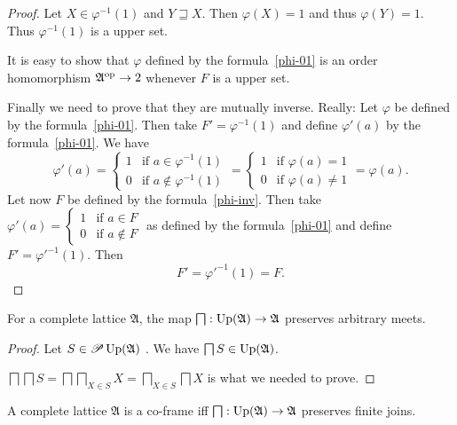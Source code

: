 \begin{proof}
Let $X\in\varphi^{-1}(1)$ and $Y\sqsupseteq X$. Then $\varphi(X)=1$
and thus $\varphi(Y)=1$. Thus $\varphi^{-1}(1)$ is a upper set.

It is easy to show that $\varphi$ defined by the formula~\ref{phi-01}
is an order homomorphism $\mathfrak{A}^{\operatorname{op}}\rightarrow2$ whenever
$F$ is a upper set.

Finally we need to prove that they are mutually inverse. Really: Let
$\varphi$ be defined by the formula~\ref{phi-01}. Then take $F'=\varphi^{-1}(1)$
and define $\varphi'(a)$ by the formula~\ref{phi-01}. We have 
\[
\varphi'(a)=\left\{ \begin{array}{ll}
1 & \text{if }a\in\varphi^{-1}(1)\\
0 & \text{if }a\notin\varphi^{-1}(1)
\end{array}\right.=\left\{ \begin{array}{ll}
1 & \text{if }\varphi(a)=1\\
0 & \text{if }\varphi(a)\neq1
\end{array}\right.=\varphi(a).
\]
Let now $F$ be defined by the formula~\ref{phi-inv}. Then take
$\varphi'(a)=\left\{ \begin{array}{ll}
1 & \text{if }a\in F\\
0 & \text{if }a\notin F
\end{array}\right.$ as defined by the formula~\ref{phi-01} and define $F'=\varphi'^{-1}(1)$.
Then 
\[
F'=\varphi'^{-1}(1)=F.
\]
\end{proof}
\begin{lem}
For a complete lattice $\mathfrak{A}$, the map $\bigsqcap:\operatorname{Up}(\mathfrak{A})\rightarrow\mathfrak{A}$
preserves arbitrary meets.\end{lem}
\begin{proof}
Let $S\in\mathscr{P}\operatorname{Up}(\mathfrak{A})$ . We have $\bigsqcap S\in\operatorname{Up}(\mathfrak{A})$.

$\bigsqcap\bigsqcap S=\bigsqcap\bigsqcap_{X\in S}X=\bigsqcap_{X\in S}\bigsqcap X$
is what we needed to prove.\end{proof}
\begin{lem}
A complete lattice $\mathfrak{A}$ is a co-frame iff $\bigsqcap:\operatorname{Up}(\mathfrak{A})\rightarrow\mathfrak{A}$
preserves finite joins.\end{lem}
